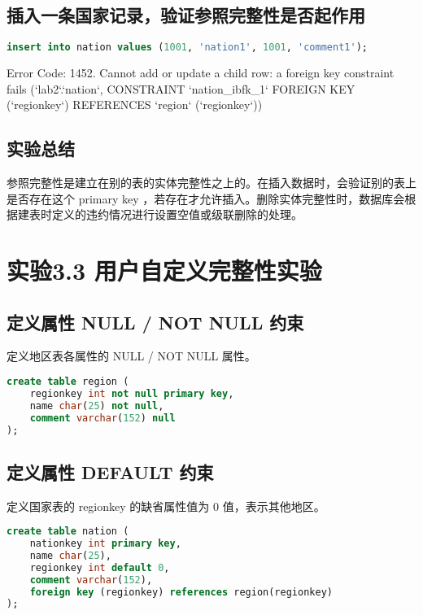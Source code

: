 \documentclass{article}
\begin{document}
\subsection{插入一条国家记录，验证参照完整性是否起作用}

\begin{lstlisting}[language=sql]
insert into nation values (1001, 'nation1', 1001, 'comment1');
\end{lstlisting}

Error Code: 1452. Cannot add or update a child row: a foreign key constraint fails (`lab2`.`nation`, CONSTRAINT `nation\_ibfk\_1` FOREIGN KEY (`regionkey`) REFERENCES `region` (`regionkey`))

\subsection{实验总结}

参照完整性是建立在别的表的实体完整性之上的。在插入数据时，会验证别的表上是否存在这个 primary key ，若存在才允许插入。删除实体完整性时，数据库会根据建表时定义的违约情况进行设置空值或级联删除的处理。

\section{实验3.3 用户自定义完整性实验}

\subsection{定义属性 NULL / NOT NULL 约束}

定义地区表各属性的 NULL / NOT NULL 属性。

\begin{lstlisting}[language=sql]
create table region (
	regionkey int not null primary key,
    name char(25) not null,
    comment varchar(152) null
);
\end{lstlisting}

\subsection{定义属性 DEFAULT 约束}

定义国家表的 regionkey 的缺省属性值为 0 值，表示其他地区。

\begin{lstlisting}[language=sql]
create table nation (
	nationkey int primary key,
    name char(25),
    regionkey int default 0,
    comment varchar(152),
    foreign key (regionkey) references region(regionkey)
);
\end{lstlisting}
\end{document}
